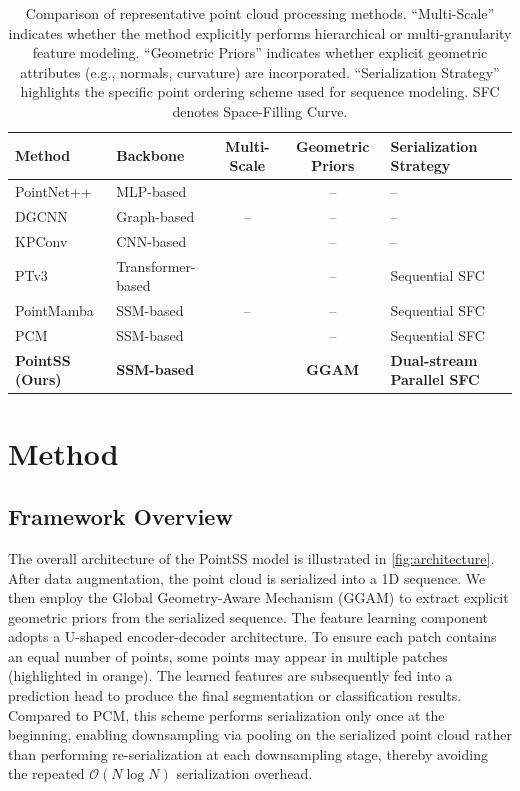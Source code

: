 \documentclass[a4paper,fleqn]{cas-sc}
\begin{document}
\begin{table}[htbp]
	\centering
	\caption{Comparison of representative point cloud processing methods. ``Multi-Scale'' indicates whether the method explicitly performs hierarchical or multi-granularity feature modeling. ``Geometric Priors'' indicates whether explicit geometric attributes (e.g., normals, curvature) are incorporated. ``Serialization Strategy'' highlights the specific point ordering scheme used for sequence modeling. SFC denotes Space-Filling Curve.}
	\label{tab:related_comp}
	\begin{tabular}{llccl}
		\hline
		\textbf{Method} & \textbf{Backbone} & \textbf{Multi-Scale} & \textbf{Geometric Priors} & \textbf{Serialization Strategy} \\
		\hline
		PointNet++ \cite{PointNet++} & MLP-based       & \checkmark & --   & --                        \\
		DGCNN \cite{DGCNN}           & Graph-based     & --         & --   & --                        \\
		KPConv \cite{KPConv}         & CNN-based       & \checkmark & --   & --                        \\
		PTv3 \cite{ptv3}             & Transformer-based & \checkmark & --  & Sequential SFC            \\
		PointMamba \cite{PointMamba} & SSM-based       & --         & --   & Sequential SFC            \\
		PCM \cite{pcm}               & SSM-based       & \checkmark & --   & Sequential SFC            \\
		\textbf{PointSS (Ours)}      & \textbf{SSM-based} & \textbf{\checkmark} & \textbf{GGAM} & \textbf{Dual-stream Parallel SFC} \\
		\hline
	\end{tabular}
\end{table}

\section{Method}\label{sec:method}

\subsection{Framework Overview}

The overall architecture of the PointSS model is illustrated in \cref{fig:architecture}. After data augmentation, the point cloud is serialized into a 1D sequence\cite{ptv3}. We then employ the Global Geometry-Aware Mechanism (GGAM) to extract explicit geometric priors from the serialized sequence. The feature learning component adopts a U-shaped encoder-decoder architecture. To ensure each patch contains an equal number of points, some points may appear in multiple patches (highlighted in orange). The learned features are subsequently fed into a prediction head to produce the final segmentation or classification results. Compared to PCM, this scheme performs serialization only once at the beginning, enabling downsampling via pooling on the serialized point cloud rather than performing re-serialization at each downsampling stage, thereby avoiding the repeated $\mathcal{O}(N\log N)$ serialization overhead.
\end{document}
